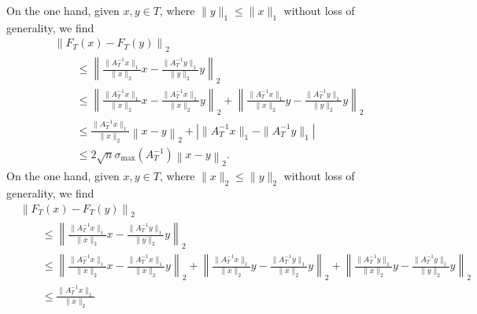 \documentclass[10pt,a4paper]{article}
\begin{document}
\begin{itemize}
\color{red}
        On the one hand, given $x, y \in T$, 
        where $\| y \|_{1} \leq \| x \|_{1}$ without loss of generality, we find 
        \begin{align*}
            &
            \left\| F_T(x) - F_T(y) \right\|_{2}
            \\&\qquad 
            \leq 
            \left\| 
                \frac{ \| A_{T}^{-1} x \|_{1} }{ \|x\|_2 } x - \frac{ \| A_{T}^{-1} y \|_{1} }{ \|y\|_2 } y
            \right\|_{2}
            \\&\qquad 
            \leq 
            \left\| 
                \frac{ \| A_{T}^{-1} x \|_{1} }{ \|x\|_2 } x - \frac{ \| A_{T}^{-1} x \|_{1} }{ \|x\|_2 } y
            \right\|_{2}
            +
            \left\| 
                \frac{ \| A_{T}^{-1} x \|_{1} }{ \|x\|_2 } y - \frac{ \| A_{T}^{-1} y \|_{1} }{ \|y\|_2 } y
            \right\|_{2}
            \\&\qquad 
            \leq 
            \frac{ \| A_{T}^{-1} x \|_{1} }{ \|x\|_2 } 
            \left\| 
                x - y
            \right\|_{2}
            +
            \left| \|A_{T}^{-1} x\|_1 - \|A_{T}^{-1} y\|_1 \right|
            \\&\qquad 
            \leq 
            2\sqrt{n} \sigma_{\max}(A_{T}^{-1}) 
            \left\| x - y \right\|_{2}
            .
        \end{align*}
        On the one hand, given $x, y \in T$, 
        where $\| x \|_{2} \leq \| y \|_{2}$ without loss of generality, we find 
        \begin{align*}
            &
            \left\| F_T(x) - F_T(y) \right\|_{2}
            \\&\qquad 
            \leq 
            \left\| 
                \frac{ \| A_{T}^{-1} x \|_{1} }{ \|x\|_2 } x - \frac{ \| A_{T}^{-1} y \|_{1} }{ \|y\|_2 } y
            \right\|_{2}
            \\&\qquad 
            \leq 
            \left\| 
                \frac{ \| A_{T}^{-1} x \|_{1} }{ \|x\|_2 } x - \frac{ \| A_{T}^{-1} x \|_{1} }{ \|x\|_2 } y
            \right\|_{2}
            +
            \left\| 
                \frac{ \| A_{T}^{-1} x \|_{1} }{ \|x\|_2 } y - \frac{ \| A_{T}^{-1} y \|_{1} }{ \|x\|_2 } y
            \right\|_{2}
            +
            \left\| 
                \frac{ \| A_{T}^{-1} y \|_{1} }{ \|x\|_2 } y - \frac{ \| A_{T}^{-1} y \|_{1} }{ \|y\|_2 } y
            \right\|_{2}
            \\&\qquad 
            \leq 
            \frac{ \| A_{T}^{-1} x \|_{1} }{ \|x\|_2 } 

\end{align*}
\end{itemize}
\end{document}
